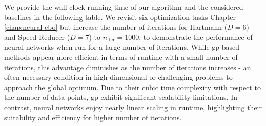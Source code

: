We provide the wall-clock running time of our algorithm and the considered baselines in the following table. We revisit six optimization tasks Chapter \ref{chap:neural-cbo} but increase the number of iterations for Hartmann ($D = 6$) and Speed Reducer ($D = 7$) to $n_{\text{iter}} = 1000$, to demonstrate the performance of neural networks when run for a large number of iterations. While \ac{gp}-based methods appear more efficient in terms of runtime with a small number of iterations, this advantage diminishes as the number of iterations increases - an often necessary condition in high-dimensional or challenging problems to approach the global optimum. Due to their cubic time complexity with respect to the number of data points, \acf{gp} exhibit significant scalability limitations. In contrast, neural networks enjoy nearly linear scaling in runtime, highlighting their suitability and efficiency for higher number of iterations.
\begin{table}[ht!]
\centering
{}
\caption{Wall-clock runtime (in seconds) of our algorithm and baselines across optimization tasks.}
\end{table}

